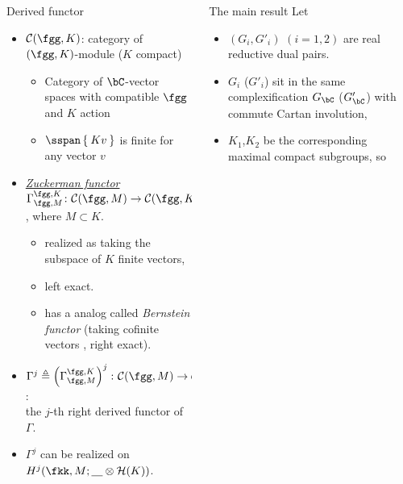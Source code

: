 \documentclass[final,hyperref={pdfpagelabels=false}]{beamer} %
\def\emph#1{{\em \underline{#1}}}
\def\cC{\mathcal{C}}
\begin{document}
\begin{frame}
\begin{columns}[t]
\begin{column}{.48\linewidth}
\begin{block}{Derived functor}
  \begin{itemize}
     \item $\cC(\fgg,K)$: category of $(\fgg, K)$-module ($K$ compact)
      \begin{itemize}
      \item Category of $\bC$-vector spaces  with compatible $\fgg$ and $K$ action
      \item $\sspan\Set{Kv}$ is finite for any vector $v$  
      \end{itemize}
    \item \emph{Zuckerman functor}  $\Gamma_{\fgg,M}^{\fgg,K}
      \colon \cC(\fgg,M)\to \cC(\fgg,K)$, 
      where $M\subset K$.
      \begin{itemize}
      \item realized as taking the subspace of $K$ finite vectors,
      \item left exact.
      \item has a analog called {\em Bernstein functor} (taking cofinite vectors
        , right exact).
      \end{itemize}
    \item $\Gamma^j\triangleq\left(\Gamma_{\fgg,M}^{\fgg,K}\right)^j
      \colon \cC(\fgg,M)\to \cC(\fgg,K)$: \\
      the $j$-th right derived functor of $\Gamma$.
    \item $\Gamma^j$ can be realized on $H^j(\fkk,M; \underline{\hskip1em} \otimes \mathcal{H}(K))$.
    \end{itemize}
\end{block}
\end{column}
\begin{column}{.48\linewidth}
    \begin{block}{The main result}
      Let
      \begin{itemize}
      \item $(G_i,G'_i)$ $(i=1,2)$ are real reductive dual pairs.
      \item $G_i$ ($G'_i$) sit in the same complexification $G_\bC$ ($G'_\bC$)
        with commute Cartan involution,
      \item $K_1$,$K_2$ be the corresponding maximal compact subgroups, so
        \begin{itemize}

\end{itemize}
\end{itemize}
\end{block}
\end{column}
\end{columns}
\end{frame}
\end{document}
